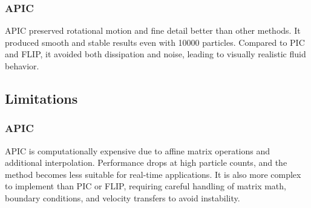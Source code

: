 \subsubsection{APIC}
APIC preserved rotational motion and fine detail better than other methods. It produced smooth and stable results even with 10000 particles. Compared to PIC and FLIP, it avoided both dissipation and noise, leading to visually realistic fluid behavior.

\subsection{Limitations}
\subsubsection{APIC}
APIC is computationally expensive due to affine matrix operations and additional interpolation. Performance drops at high particle counts, and the method becomes less suitable for real-time applications. It is also more complex to implement than PIC or FLIP, requiring careful handling of matrix math, boundary conditions, and velocity transfers to avoid instability.